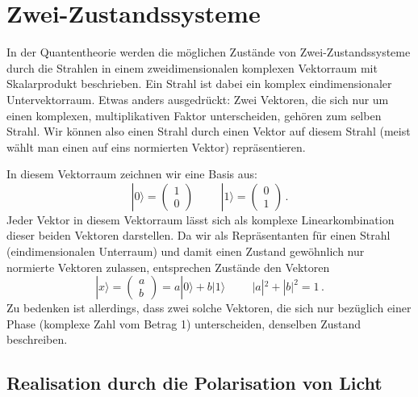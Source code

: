     
\section{Zwei-Zustandssysteme}

In der Quantentheorie werden die m\"oglichen Zust\"ande von 
Zwei-Zustandssysteme 
durch die Strahlen in einem
zweidimensionalen komplexen Vektorraum mit Skalarprodukt beschrieben. 
Ein Strahl ist dabei ein komplex eindimensionaler
Untervektorraum. Etwas anders ausgedr\"uckt: Zwei Vektoren, die sich nur um einen komplexen, multiplikativen
Faktor unterscheiden, geh\"oren zum selben Strahl. Wir k\"onnen also einen Strahl durch einen Vektor auf diesem
Strahl (meist w\"ahlt man einen auf eins normierten Vektor) repr\"asentieren. 

In diesem Vektorraum zeichnen wir eine Basis aus:
\begin{equation}
\label{eq_QM1_Basis}
           |0\rangle = \left( \!\! \begin{array}{c}  1 \\ 0 \end{array} \!\! \right)  \hspace{1cm}
           |1\rangle = \left(\!\! \begin{array}{c}  0 \\ 1 \end{array}  \!\! \right)  \, .
\end{equation}
Jeder Vektor in diesem Vektorraum l\"asst sich als komplexe Linearkombination dieser beiden Vektoren
darstellen. Da wir als Repr\"asentanten f\"ur einen Strahl (eindimensionalen Unterraum) und damit einen Zustand 
gew\"ohnlich nur normierte Vektoren zulassen, entsprechen Zust\"ande den Vektoren
\begin{equation}
\label{eq_QM1_Einheitsvektor}
           | x \rangle = \left(\!\! \begin{array}{c}  a \\ b \end{array} \!\! \right) = 
            a |0\rangle + b |1 \rangle    \hspace{1cm} |a|^2 + |b|^2 = 1 \, .
\end{equation}
Zu bedenken ist allerdings, dass zwei solche Vektoren, die sich nur bez\"uglich einer
Phase (komplexe Zahl vom Betrag 1) unterscheiden, denselben Zustand beschreiben. 

\subsection{Realisation durch die Polarisation von Licht}

